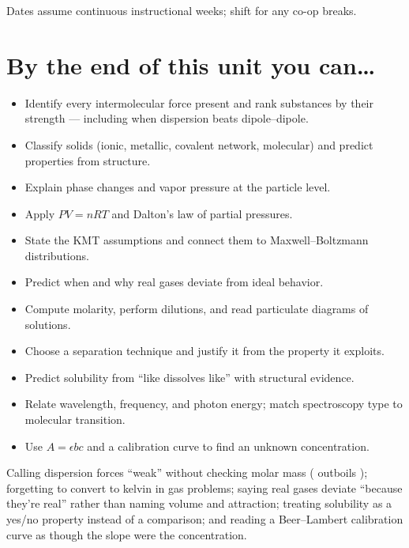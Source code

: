 \documentclass{apchem-worksheet}
\begin{document}
{\sffamily\footnotesize Dates assume continuous instructional weeks; shift
for any co-op breaks.}

\vspace{0.5em}
\section*{\sffamily By the end of this unit you can\ldots}

\begin{itemize}[leftmargin=*,itemsep=0.12em]
  \item Identify every intermolecular force present and rank substances by
        their strength --- including when dispersion beats dipole--dipole. 
  \item Classify solids (ionic, metallic, covalent network, molecular) and
        predict properties from structure. 
  \item Explain phase changes and vapor pressure at the particle level. 
  \item Apply $PV = nRT$ and Dalton's law of partial pressures. 
  \item State the KMT assumptions and connect them to Maxwell--Boltzmann
        distributions. 
  \item Predict when and why real gases deviate from ideal behavior. 
  \item Compute molarity, perform dilutions, and read particulate diagrams
        of solutions. 
  \item Choose a separation technique and justify it from the property it
        exploits. 
  \item Predict solubility from ``like dissolves like'' with structural
        evidence. 
  \item Relate wavelength, frequency, and photon energy; match spectroscopy
        type to molecular transition. 
  \item Use $A = \epsilon bc$ and a calibration curve to find an unknown
        concentration. 
\end{itemize}

\begin{apctrap}
Calling dispersion forces ``weak'' without checking molar mass (
outboils ); forgetting to convert to kelvin in gas problems; saying
real gases deviate ``because they're real'' rather than naming volume and
attraction; treating solubility as a yes/no property instead of a
comparison; and reading a Beer--Lambert calibration curve as though the
slope were the concentration.
\end{apctrap}
\end{document}
